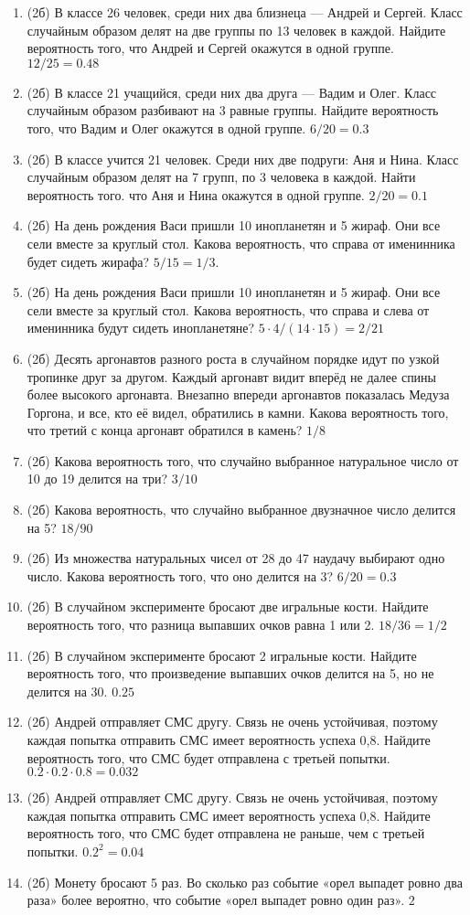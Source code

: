 \documentclass[a4paper, 12pt]{article}
\begin{document}
\begin{enumerate}
\item (2б) В классе 26 человек, среди них два близнеца — Андрей и Сергей. Класс случайным образом делят на две группы по 13 человек в каждой. 
Найдите вероятность того, что Андрей и Сергей окажутся в одной группе. $12/25 = 0.48$
\item (2б) В классе 21 учащийся, среди них два друга — Вадим и Олег. Класс случайным образом разбивают на 3 равные группы. Найдите вероятность того, 
что Вадим и Олег окажутся в одной группе. $6/20=0.3$
\item (2б) В классе учится 21 человек. Среди них две подруги: Аня и Нина. Класс случайным образом делят на 7 групп, по 3 человека в каждой. 
Найти вероятность того. что Аня и Нина окажутся в одной группе. $2/20=0.1$
\item (2б) На день рождения Васи пришли 10 инопланетян и 5 жираф. Они все сели вместе за круглый стол. 
Какова вероятность, что справа от именинника будет сидеть жирафа? $5/15=1/3$.
\item (2б) На день рождения Васи пришли 10 инопланетян и 5 жираф. Они все сели вместе за круглый стол. 
Какова вероятность, что справа и слева от именинника будут сидеть инопланетяне? $5\cdot 4/(14\cdot 15) = 2/21$
\item (2б) Десять аргонавтов разного роста в случайном порядке идут по узкой тропинке друг за другом. 
Каждый аргонавт видит вперёд не далее спины более высокого аргонавта. 
Внезапно впереди аргонавтов показалась Медуза Горгона, и все, кто её видел, обратились в камни. 
Какова вероятность того, что третий с конца аргонавт обратился в камень? $1/8$
\item (2б) Какова вероятность того, что случайно выбранное натуральное число от 10 до 19 делится на три? $3/10$
\item (2б) Какова вероятность, что случайно выбранное двузначное число делится на 5? $18/90$
\item (2б) Из множества натуральных чисел от 28 до 47 наудачу выбирают одно число. Какова вероятность того, что оно делится на 3? $6/20=0.3$
\item (2б) В случайном эксперименте бросают две игральные кости. Найдите вероятность того, что разница выпавших очков равна 1 или 2. $18/36=1/2$
\item (2б) В случайном эксперименте бросают 2 игральные кости. Найдите вероятность того, что произведение выпавших очков делится на 5, 
но не делится на 30. $0.25$
\item (2б) Андрей отправляет СМС другу. Связь не очень устойчивая, поэтому каждая попытка отправить СМС имеет вероятность успеха 0,8. 
Найдите вероятность того, что СМС будет отправлена с третьей попытки. $0.2 \cdot 0.2 \cdot 0.8 = 0.032$
\item (2б) Андрей отправляет СМС другу. Связь не очень устойчивая, поэтому каждая попытка отправить СМС имеет вероятность успеха 0,8. 
Найдите вероятность того, что СМС будет отправлена не раньше, чем с третьей попытки. $0.2^2 = 0.04$
\item (2б) Монету бросают 5 раз. Во сколько раз событие «орел выпадет ровно два раза» более вероятно, что событие «орел выпадет ровно один раз». $2$


\end{enumerate}
\end{document}
